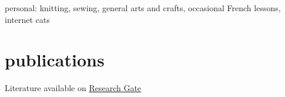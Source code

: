 \documentclass[]{cv} %
\begin{document}
{\boldfont personal:} knitting, sewing, general arts and crafts, occasional 
French lessons, internet cats

\clearpage
\section{publications}

{Literature available on 
\href{https://www.researchgate.net/profile/Helga_Ingimundardottir}{{\boldfont 
Research
 Gate}}}
\nocite{*}
\vspace{-6pt} %





\printbibliography[type=misc, title={seminars}, heading=subbibliography]


\end{document}
